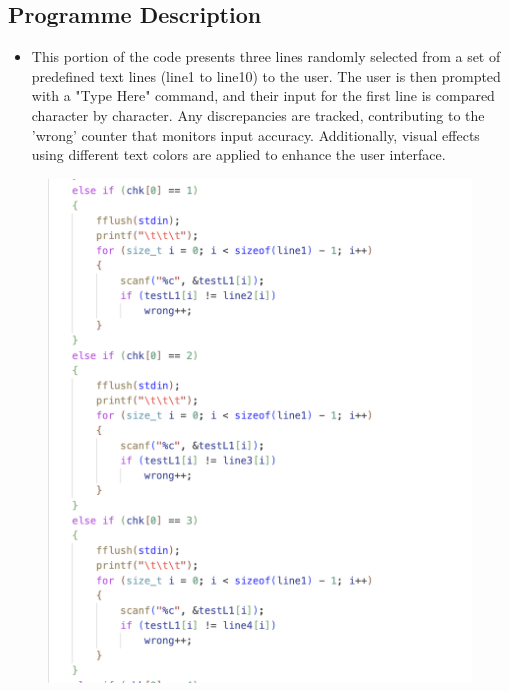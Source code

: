 \subsection{Programme Description}
    \begin{itemize}
        \item This portion of the code presents three lines randomly selected from a set of predefined text lines (line1 to line10) to the user. The user is then prompted with a "Type Here" command, and their input for the first line is compared character by character. Any discrepancies are tracked, contributing to the 'wrong' counter that monitors input accuracy. Additionally, visual effects using different text colors are applied to enhance the user interface.
    \end{itemize}
\newpage
\begin{figure}[h]
     \includegraphics[scale=0.16]{CodeScreenShot/speedtest-6.png}

\end{figure}
